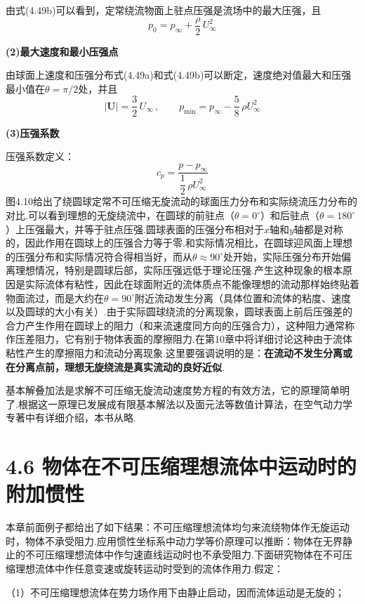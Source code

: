 由式(4.49b)可以看到，定常绕流物面上驻点压强是流场中的最大压强，且
\begin{equation*}
p_0=p_\infty+\frac{\rho}{2}\,U_\infty^{2}
\tag{4.50}
\end{equation*}

\textbf{(2)最大速度和最小压强点}

由球面上速度和压强分布式(4.49a)和式(4.49b)可以断定，速度绝对值最大和压强最小值在$\theta=\pi/2$处，并且
\[
|\boldsymbol{U}|=\frac{3}{2}\,U_\infty\,,\qquad p_{\min}=p_\infty-\frac{5}{8}\,\rho U_\infty^{2}
\]

\textbf{(3)压强系数}

压强系数定义：
\[
c_p=\frac{p-p_\infty}{\dfrac{1}{2}\,\rho U_\infty^{2}}
\]
图4.10给出了绕圆球定常不可压缩无旋流动的球面压力分布和实际绕流压力分布的对比.可以看到理想的无旋绕流中，在圆球的前驻点（$\theta=0^{\circ}$）和后驻点（$\theta=180^{\circ}$）上压强最大，并等于驻点压强.圆球表面的压强分布相对于$x$轴和$y$轴都是对称的，因此作用在圆球上的压强合力等于零.和实际情况相比，在圆球迎风面上理想的压强分布和实际情况符合得相当好，而从$\theta\approx 90^{\circ}$处开始，实际压强分布开始偏离理想情况，特别是圆球后部，实际压强远低于理论压强.产生这种现象的根本原因是实际流体有粘性，因此在球面附近的流体质点不能像理想的流动那样始终贴着物面流过，而是大约在$\theta=90^{\circ}$附近流动发生分离（具体位置和流体的粘度、速度以及圆球的大小有关）.由于实际圆球绕流的分离现象，圆球表面上前后压强差的合力产生作用在圆球上的阻力（和来流速度同方向的压强合力），这种阻力通常称作压差阻力，它有别于物体表面的摩擦阻力.在第10章中将详细讨论这种由于流体粘性产生的摩擦阻力和流动分离现象.这里要强调说明的是：\textbf{在流动不发生分离或在分离点前，理想无旋绕流是真实流动的良好近似}.

基本解叠加法是求解不可压缩无旋流动速度势方程的有效方法，它的原理简单明了.根据这一原理已发展成有限基本解法以及面元法等数值计算法，在空气动力学专著中有详细介绍，本书从略.

\section*{4.6  物体在不可压缩理想流体中运动时的附加惯性}

本章前面例子都给出了如下结果：不可压缩理想流体均匀来流绕物体作无旋运动时，物体不承受阻力.应用惯性坐标系中动力学等价原理可以推断：物体在无界静止的不可压缩理想流体中作匀速直线运动时也不承受阻力.下面研究物体在不可压缩理想流体中作任意变速或旋转运动时受到的流体作用力.假定：

（1）不可压缩理想流体在势力场作用下由静止启动，因而流体运动是无旋的；

